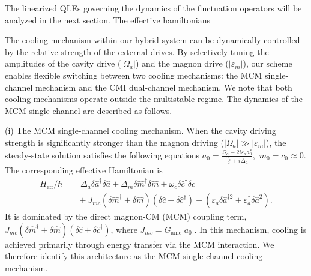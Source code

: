 \documentclass[aps, prresearch, reprint, nofootinbib, longbibliography]{revtex4-2}
\makeatletter
\renewcommand{\thesection}{\Alph{section}}%
\renewcommand{\section}{%
		\secdef{\@Appendix}{\@sAppendix}%
	}%
\newcommand{\@Appendix}[2][?]{%
		\refstepcounter{section}%
		\vspace{0.5em}
		{\centering\large\bfseries Appendix \thesection: #2\par}%
		\addcontentsline{toc}{section}{Appendix \thesection}%
		\markright{Appendix \thesection}%
	}%
\makeatother
\begin{document}
The linearized QLEs governing the dynamics of the fluctuation operators will be analyzed in the next section.
\section{The effective hamiltonians} \label{4}








The cooling mechanism within our hybrid system can be dynamically controlled by the relative strength of the external drives. By selectively tuning the amplitudes of the cavity drive (\(|\Omega_a|\)) and the magnon drive (\(|\varepsilon_m|\)), our scheme enables flexible switching between two cooling mechanisms: the MCM single-channel  mechanism and the CMI dual-channel mechanism.  
We note that both cooling mechanisms operate outside the multistable regime. 
The dynamics of the MCM single-channel are described as follows. 

(i) The MCM single-channel cooling mechanism.  When the cavity driving strength is significantly stronger than the magnon driving (\(|\Omega_a| \gg |\varepsilon_m|\)), the steady-state solution satisfies the following equations
$	a_0 = \frac{\Omega_a-2i\varepsilon_a a^*_0 }{\frac{\gamma_a}{2} + i \Delta_a}, $ $ m_0 = c_0 \approx 0.$
The corresponding effective Hamiltonian is
\begin{align}
H_{\text{eff}}/\hbar & = \Delta_a \delta\hat{a}^\dagger\delta\hat{a} + \Delta_m \delta\hat{m}^\dagger\delta\hat{m} + \omega_c \delta\hat{c}^\dagger\delta\hat{c} \nonumber \\
&\quad + J_{mc} (\delta\hat{m}^\dagger + \delta\hat{m})(\delta\hat{c} + \delta\hat{c}^\dagger)  + (\varepsilon_a \delta \hat{a}^{\dagger 2} + \varepsilon_a^*\delta \hat{a}^2 ).
\label{eq:magnon_Hamiltonian}
\end{align}
It is dominated by the direct magnon-CM (MCM) coupling term,  $J_{mc} (\delta\hat{m}^\dagger + \delta\hat{m})(\delta\hat{c} + \delta\hat{c}^\dagger)$, where
\(J_{mc} = G_{\text{amc}}|a_0|\).
In this mechanism, cooling is achieved primarily through energy transfer via the MCM interaction. We therefore identify this architecture as the MCM single-channel cooling mechanism. 
\end{document}
